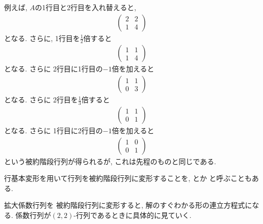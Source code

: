 \begin{example}
 例えば,
 $A$の1行目と2行目を入れ替えると,
  \begin{align*}
    \begin{pmatrix}2&2\\1&4\end{pmatrix}
  \end{align*}
  となる. 
  さらに,
  1行目を$\frac{1}{2}$倍すると
  \begin{align*}
    \begin{pmatrix}1&1\\1&4\end{pmatrix}
  \end{align*}
  となる.
  さらに
  2行目に1行目の$-1$倍を加えると
  \begin{align*}
    \begin{pmatrix}1&1\\0&3\end{pmatrix}
  \end{align*}
  となる.
  さらに
  2行目を$\frac{1}{3}$倍すると
  \begin{align*}
    \begin{pmatrix}1&1\\0&1\end{pmatrix}
  \end{align*}
  となる.
  さらに
  1行目に2行目の$-1$倍を加えると
  \begin{align*}
    \begin{pmatrix}1&0\\0&1\end{pmatrix}
  \end{align*}
  という被約階段行列が得られるが,
  これは先程のものと同じである.
\end{example}

\begin{remark}
  行基本変形を用いて行列を被約階段行列に変形することを,
  とか
  と呼ぶこともある.
\end{remark}
拡大係数行列を
被約階段行列に変形すると,
解のすぐわかる形の連立方程式になる.
係数行列が$(2,2)$-行列であるときに具体的に見ていく.

